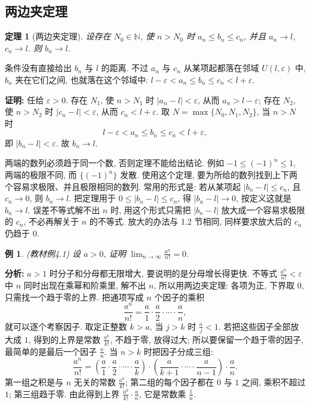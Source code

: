 \documentclass[UTF8,openany]{ctexbook}
\theoremstyle{chinesetextbook}
\newtheorem{example}{例}[section]
\newtheorem{theorem}{定理}[section]
\newenvironment{cnproof}{\par\indent\textbf{证明:} \ignorespaces}{\par}
\begin{document}
\subsection{两边夹定理}
\begin{theorem}[两边夹定理]
设存在 $N_0\in\mathbb N$, 使 $n>N_0$ 时 $a_n\le b_n\le c_n$, 并且 $a_n\to l$, $c_n\to l$. 则 $b_n\to l$.
\end{theorem}
条件没有直接给出 $b_n$ 与 $l$ 的距离. 不过 $a_n$ 与 $c_n$ 从某项起都落在邻域 $U(l,\varepsilon)$ 中, $b_n$ 夹在它们之间, 也就落在这个邻域中: $l-\varepsilon<a_n\le b_n\le c_n<l+\varepsilon$.
\begin{cnproof}
任给 $\varepsilon>0$. 存在 $N_1$, 使 $n>N_1$ 时 $|a_n-l|<\varepsilon$, 从而 $a_n>l-\varepsilon$; 存在 $N_2$, 使 $n>N_2$ 时 $|c_n-l|<\varepsilon$, 从而 $c_n<l+\varepsilon$. 取 $N=\max\{N_0,N_1,N_2\}$, 当 $n>N$ 时
\[
l-\varepsilon<a_n\le b_n\le c_n<l+\varepsilon,
\]
即 $|b_n-l|<\varepsilon$. 故 $b_n\to l$.
\end{cnproof}
两端的数列必须趋于同一个数, 否则定理不能给出结论. 例如 $-1\le(-1)^n\le1$, 两端的极限不同, 而 $\{(-1)^n\}$ 发散. 使用这个定理, 要为所给的数列找到上下两个容易求极限、并且极限相同的数列. 常用的形式是: 若从某项起 $|b_n-l|\le c_n$, 且 $c_n\to0$, 则 $b_n\to l$. 把定理用于 $0\le|b_n-l|\le c_n$, 得 $|b_n-l|\to0$, 按定义这就是 $b_n\to l$. 误差不等式解不出 $n$ 时, 用这个形式只需把 $|b_n-l|$ 放大成一个容易求极限的 $c_n$, 不必再解关于 $n$ 的不等式. 放大的办法与 1.2 节相同, 同样要求放大后的 $c_n$ 仍趋于 $0$.
\begin{example}\label{ex:4-1}
\textnormal{(教材例4.1)} 设 $a>0$, 证明 $\displaystyle\lim_{n\to\infty}\frac{a^n}{n!}=0$.
\end{example}
\par\indent\textbf{分析:} $a>1$ 时分子和分母都无限增大, 要说明的是分母增长得更快. 不等式 $\displaystyle\frac{a^n}{n!}<\varepsilon$ 中 $n$ 同时出现在乘幂和阶乘里, 解不出 $n$, 所以用两边夹定理: 各项为正, 下界取 $0$, 只需找一个趋于零的上界. 把通项写成 $n$ 个因子的乘积
\[
\frac{a^n}{n!}=\frac a1\cdot\frac a2\cdot\cdots\cdot\frac an,
\]
就可以逐个考察因子. 取定正整数 $k>a$, 当 $j>k$ 时 $\displaystyle\frac aj<1$. 若把这些因子全部放大成 $1$, 得到的上界是常数 $\displaystyle\frac{a^k}{k!}$, 不趋于零, 放得过大; 所以要保留一个趋于零的因子, 最简单的是最后一个因子 $\displaystyle\frac an$. 当 $n>k$ 时把因子分成三组:
\[
\frac{a^n}{n!}=\left(\frac a1\cdot\frac a2\cdot\cdots\cdot\frac ak\right)\cdot\left(\frac a{k+1}\cdot\cdots\cdot\frac a{n-1}\right)\cdot\frac an.
\]
第一组之积是与 $n$ 无关的常数 $\displaystyle\frac{a^k}{k!}$; 第二组的每个因子都在 $0$ 与 $1$ 之间, 乘积不超过 $1$; 第三组趋于零. 由此得到上界 $\displaystyle\frac{a^k}{k!}\cdot\frac an$, 它是常数乘 $\displaystyle\frac1n$.
\end{document}
